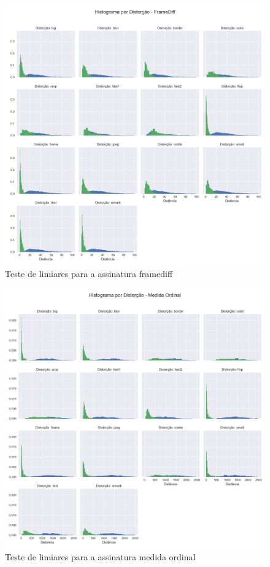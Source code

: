 \begin{figure}[h]
	\centering
	\label{fig:limiares-framediff}
	\caption{Teste de limiares para a assinatura framediff}
	\includegraphics[width=\textwidth]{dados/figuras/experimentos/histograma_distorcao_FrameDiff.png}
\end{figure}
\begin{figure}[h]
	\centering
	\label{fig:limiares-medidaordinal}
	\caption{Teste de limiares para a assinatura medida ordinal}
	\includegraphics[width=\textwidth]{dados/figuras/experimentos/histograma_distorcao_Medida_Ordinal.png}
\end{figure}
